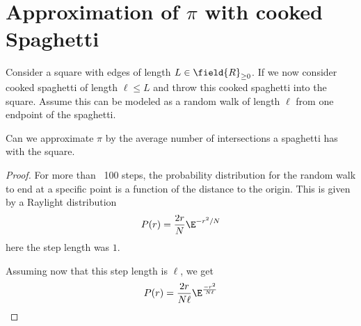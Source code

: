 \section{Approximation of $\pi$ with cooked Spaghetti}

Consider a square with edges of length $L\in \field{R}_{\geq 0}$. If
we now consider cooked spaghetti of length $\ell \leq L$ and throw
this cooked spaghetti into the square. Assume this can be modeled as a
random walk of length $\ell$ from one endpoint of the spaghetti.

Can we approximate $\pi$ by the average number of intersections a
spaghetti has with the square.

\begin{proof}
  For more than ~100 steps, the probability distribution for the
  random walk to end at a specific point is a function of the distance
  to the origin. This is given by a Raylight distribution
  \begin{align}
    P(r)=\frac{2r}{N}\E^{-r^2/N}
  \end{align}
  here the step length was $1$.

  Assuming now that this step length is $\ell$, we get
  \begin{align}
    P(r)=\frac{2r}{N \ell}\E^{\frac{-r^2}{N \ell}}
  \end{align}
\end{proof}
